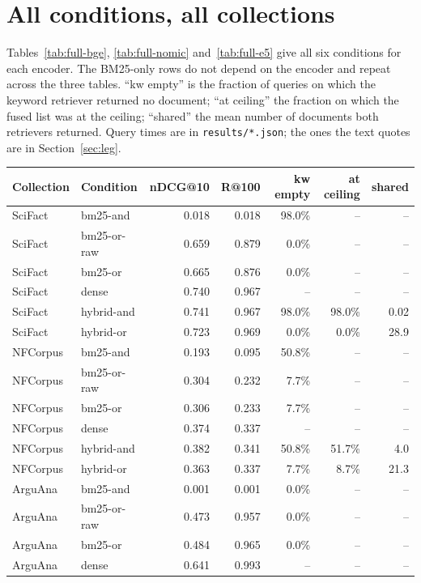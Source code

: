 \documentclass[11pt]{article}
\begin{document}
\section{All conditions, all collections}
\label{app:full}

Tables~\ref{tab:full-bge}, \ref{tab:full-nomic} and~\ref{tab:full-e5} give all six conditions for each encoder. The BM25-only rows do not depend on the encoder and repeat across the three tables. ``kw empty'' is the fraction of queries on which the keyword retriever returned no document; ``at ceiling'' the fraction on which the fused list was at the ceiling; ``shared'' the mean number of documents both retrievers returned. Query times are in \texttt{results/*.json}; the ones the text quotes are in Section~\ref{sec:leg}.

\begin{table}[p]
\centering
\small
\begin{tabular}{llrrrrr}
\toprule
Collection & Condition & nDCG@10 & R@100 & kw empty & at ceiling & shared \\
\midrule
SciFact & bm25-and & 0.018 & 0.018 & 98.0\% & -- & -- \\
SciFact & bm25-or-raw & 0.659 & 0.879 & 0.0\% & -- & -- \\
SciFact & bm25-or & 0.665 & 0.876 & 0.0\% & -- & -- \\
SciFact & dense & 0.740 & 0.967 & -- & -- & -- \\
SciFact & hybrid-and & 0.741 & 0.967 & 98.0\% & 98.0\% & 0.02 \\
SciFact & hybrid-or & 0.723 & 0.969 & 0.0\% & 0.0\% & 28.9 \\
\midrule
NFCorpus & bm25-and & 0.193 & 0.095 & 50.8\% & -- & -- \\
NFCorpus & bm25-or-raw & 0.304 & 0.232 & 7.7\% & -- & -- \\
NFCorpus & bm25-or & 0.306 & 0.233 & 7.7\% & -- & -- \\
NFCorpus & dense & 0.374 & 0.337 & -- & -- & -- \\
NFCorpus & hybrid-and & 0.382 & 0.341 & 50.8\% & 51.7\% & 4.0 \\
NFCorpus & hybrid-or & 0.363 & 0.337 & 7.7\% & 8.7\% & 21.3 \\
\midrule
ArguAna & bm25-and & 0.001 & 0.001 & 0.0\% & -- & -- \\
ArguAna & bm25-or-raw & 0.473 & 0.957 & 0.0\% & -- & -- \\
ArguAna & bm25-or & 0.484 & 0.965 & 0.0\% & -- & -- \\
ArguAna & dense & 0.641 & 0.993 & -- & -- & -- \\

\end{tabular}
\end{table}
\end{document}
